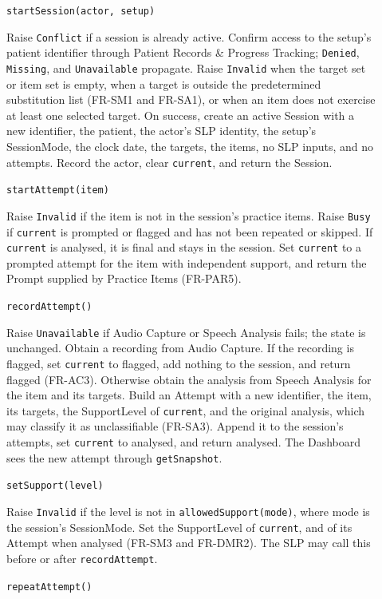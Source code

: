 \documentclass[12pt, titlepage]{article}
\begin{document}
\begin{description}
\item[] \texttt{startSession(actor, setup)}\par
Raise \texttt{Conflict} if a session is already active. Confirm access to the
setup's patient identifier through Patient Records \& Progress Tracking;
\texttt{Denied}, \texttt{Missing}, and \texttt{Unavailable} propagate. Raise
\texttt{Invalid} when the target set or item set is empty, when a target is
outside the predetermined substitution list (FR-SM1 and FR-SA1), or when an
item does not exercise at least one selected target. On success, create an
active Session with a new identifier, the patient, the actor's SLP identity,
the setup's SessionMode, the clock date, the targets, the items, no SLP inputs,
and no attempts. Record the actor, clear \texttt{current}, and return the
Session.
\item[] \texttt{startAttempt(item)}\par
Raise \texttt{Invalid} if the item is not in the session's practice items.
Raise \texttt{Busy} if \texttt{current} is prompted or flagged and has not been
repeated or skipped. If \texttt{current} is analysed, it is final and stays in
the session. Set \texttt{current} to a prompted attempt for the item with
independent support, and return the Prompt supplied by Practice Items
(FR-PAR5).
\item[] \texttt{recordAttempt()}\par
Raise \texttt{Unavailable} if Audio Capture or Speech Analysis fails; the state
is unchanged. Obtain a recording from Audio Capture. If the recording is
flagged, set \texttt{current} to flagged, add nothing to the session, and
return flagged (FR-AC3). Otherwise obtain the analysis from Speech Analysis
for the item and its targets. Build an Attempt with a new identifier, the item,
its targets, the SupportLevel of \texttt{current}, and the original analysis,
which may classify it as unclassifiable (FR-SA3). Append it to the session's
attempts, set \texttt{current} to analysed, and return analysed. The Dashboard
sees the new attempt through \texttt{getSnapshot}.
\item[] \texttt{setSupport(level)}\par
Raise \texttt{Invalid} if the level is not in \texttt{allowedSupport(mode)},
where mode is the session's SessionMode. Set the SupportLevel of
\texttt{current}, and of its Attempt when analysed (FR-SM3 and FR-DMR2). The
SLP may call this before or after \texttt{recordAttempt}.
\item[] \texttt{repeatAttempt()}\par

\end{description}
\end{document}
